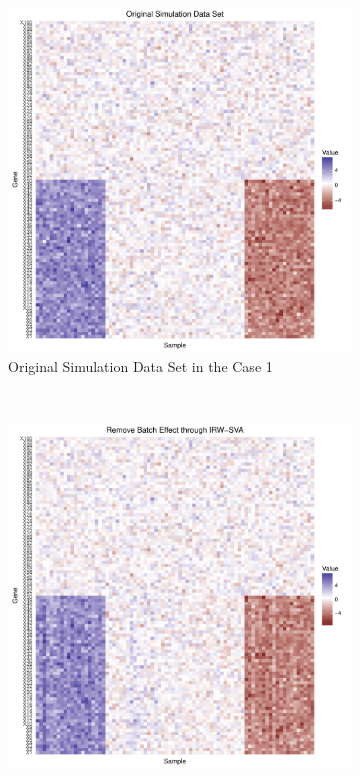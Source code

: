 \documentclass[11pt]{article}
\begin{document}
\begin{figure}[h!]
    \centering
    \begin{subfigure}[b]{0.3\textwidth}
        \centering
        \includegraphics[width = \textwidth]{figures/simulate4.pdf}
        \caption{Original Simulation Data Set in the Case 1}
    \end{subfigure}%
~
    \begin{subfigure}[b]{0.3\textwidth}
        \centering
        \includegraphics[width = \textwidth]{figures/sva4.pdf}

\end{subfigure}
\end{figure}
\end{document}
